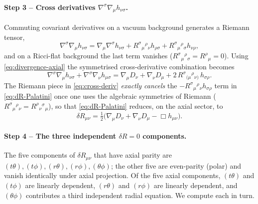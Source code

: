 \paragraph{Step 3 -- Cross derivatives
$\nabla^{\sigma}\nabla_{\mu}h_{\nu\sigma}$.}
Commuting covariant derivatives on a vacuum background generates
a Riemann tensor,
\begin{equation}
  \nabla^{\sigma}\nabla_{\mu}h_{\nu\sigma}
  = \nabla_{\mu}\nabla^{\sigma}h_{\nu\sigma}
   + R^{\sigma}{}_{\mu}{}^{\rho}{}_{\nu}h_{\rho\sigma}
   + R^{\sigma}{}_{\mu}{}^{\rho}{}_{\sigma}h_{\nu\rho},
\end{equation}
and on a Ricci-flat background the last term vanishes
($R^{\sigma}{}_{\mu}{}^{\rho}{}_{\sigma}=R^{\rho}{}_{\mu}=0$).
Using \eqref{eq:divergence-axial} the symmetrised cross-derivative
combination becomes
\begin{equation}
  \nabla^{\sigma}\nabla_{\mu}h_{\nu\sigma}
  +\nabla^{\sigma}\nabla_{\nu}h_{\mu\sigma}
  =
  \nabla_{\mu}D_{\nu}+\nabla_{\nu}D_{\mu}
  + 2\,R^{\sigma}{}_{(\mu}{}^{\rho}{}_{\nu)}\,h_{\sigma\rho}.
\label{eq:cross-deriv}
\end{equation}
The Riemann piece in \eqref{eq:cross-deriv} \emph{exactly
cancels} the $-R^{\sigma}{}_{\mu}{}^{\rho}{}_{\nu}h_{\sigma\rho}$
term in \eqref{eq:dR-Palatini} once one uses the algebraic
symmetries of Riemann
($R^{\sigma}{}_{\mu}{}^{\rho}{}_{\nu}
= R^{\rho}{}_{\nu}{}^{\sigma}{}_{\mu}$), so that
\eqref{eq:dR-Palatini} reduces, on the axial sector, to
\begin{equation}
  \delta R_{\mu\nu}
  = \tfrac{1}{2}\bigl(\nabla_{\mu}D_{\nu}+\nabla_{\nu}D_{\mu}
                       -\Box h_{\mu\nu}\bigr).
\label{eq:dR-axial-reduced}
\end{equation}

\paragraph{Step 4 -- The three independent $\delta R=0$
components.}
The five components of $\delta R_{\mu\nu}$ that have axial
parity are $(t\theta),(t\phi),(r\theta),(r\phi),(\theta\phi)$;
the other five are even-parity (polar) and vanish identically
under axial projection. Of the five axial components,
$(t\theta)$ and $(t\phi)$ are linearly dependent,
$(r\theta)$ and $(r\phi)$ are linearly dependent, and
$(\theta\phi)$ contributes a third independent radial equation.
We compute each in turn.

